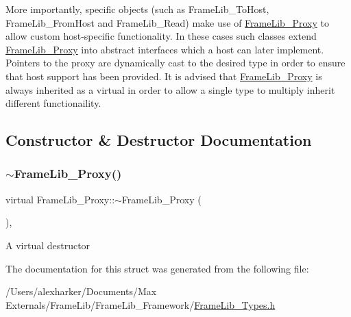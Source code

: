 More importantly, specific objects (such as Frame\+Lib\+\_\+\+To\+Host, Frame\+Lib\+\_\+\+From\+Host and Frame\+Lib\+\_\+\+Read) make use of \hyperlink{struct_frame_lib___proxy}{Frame\+Lib\+\_\+\+Proxy} to allow custom host-\/specific functionality. In these cases such classes extend \hyperlink{struct_frame_lib___proxy}{Frame\+Lib\+\_\+\+Proxy} into abstract interfaces which a host can later implement. Pointers to the proxy are dynamically cast to the desired type in order to ensure that host support has been provided. It is advised that \hyperlink{struct_frame_lib___proxy}{Frame\+Lib\+\_\+\+Proxy} is always inherited as a virtual in order to allow a single type to multiply inherit different functionaility. 

\subsection{Constructor \& Destructor Documentation}
\mbox{\label{struct_frame_lib___proxy_a1c334d129eba0aaccb23e286e742771f}} 
\subsubsection{\texorpdfstring{$\sim$\+Frame\+Lib\+\_\+\+Proxy()}{~FrameLib\_Proxy()}}
{\footnotesize\ttfamily virtual Frame\+Lib\+\_\+\+Proxy\+::$\sim$\+Frame\+Lib\+\_\+\+Proxy (\begin{DoxyParamCaption}{ }\end{DoxyParamCaption})\hspace{0.3cm}{\ttfamily [inline]}, {\ttfamily [virtual]}}

A virtual destructor 

The documentation for this struct was generated from the following file\+:\begin{DoxyCompactItemize}
\item 
/\+Users/alexharker/\+Documents/\+Max Externals/\+Frame\+Lib/\+Frame\+Lib\+\_\+\+Framework/\hyperlink{_frame_lib___types_8h}{Frame\+Lib\+\_\+\+Types.\+h}\end{DoxyCompactItemize}
